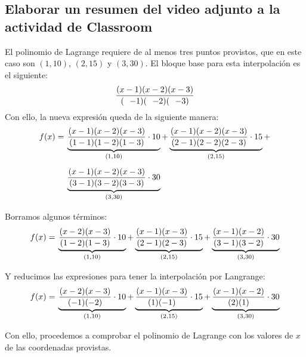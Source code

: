 \documentclass[letterpaper, 12pt]{article}
\begin{document}
\thispagestyle{fancy}
\subsection*{Elaborar un resumen del video adjunto a la actividad de Classroom}
\justify
El polinomio de Lagrange requiere de al menos tres puntos provistos, que en este caso son \(\left(1,10\right)\), 
\(\left(2,15\right)\) y \(\left(3,30\right)\). El bloque base para esta interpolación es el siguiente:
{\large\[{(x-1)(x-2)(x-3) \over (\:\:\:-1)(\:\:\:-2)(\:\:\:-3)}\]}
Con ello, la nueva expresión queda de la siguiente manera:
{\large\begin{equation*}
    \begin{aligned}
        f(x)=\:&\underbrace{{(x-1)(x-2)(x-3)\over(1-1)(1-2)(1-3)}\cdot 10}_{\left(1,10\right)}+
\underbrace{{(x-1)(x-2)(x-3)\over(2-1)(2-2)(2-3)}\cdot 15}_{\left(2,15\right)}+\\[5pt]
&\underbrace{{(x-1)(x-2)(x-3)\over(3-1)(3-2)(3-3)}\cdot 30}_{\left(3,30\right)}\\[5pt]
    \end{aligned}
\end{equation*}}
Borramos algunos términos:
{\large\begin{equation*}
    \begin{aligned}
        f(x)=\:&\underbrace{{(x-2)(x-3)\over(1-2)(1-3)}\cdot 10}_{\left(1,10\right)}+
\underbrace{{(x-1)(x-3)\over(2-1)(2-3)}\cdot 15}_{\left(2,15\right)}+
\underbrace{{(x-1)(x-2)\over(3-1)(3-2)}\cdot 30}_{\left(3,30\right)}\\[5pt]
    \end{aligned}
\end{equation*}}
Y reducimos las expresiones para tener la interpolación por Langrange:
{\large\begin{equation*}
    \begin{aligned}
        f(x)=\:&\underbrace{{(x-2)(x-3)\over(-1)(-2)}\cdot 10}_{\left(1,10\right)}+
\underbrace{{(x-1)(x-3)\over(1)(-1)}\cdot 15}_{\left(2,15\right)}+
\underbrace{{(x-1)(x-2)\over(2)(1)}\cdot 30}_{\left(3,30\right)}\\[5pt]
    \end{aligned}
\end{equation*}}
\justify
Con ello, procedemos a comprobar el polinomio de Lagrange con los valores de \(x\) de las coordenadas provistas.
\end{document}
